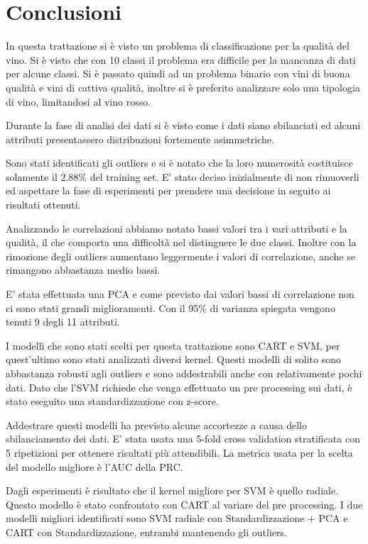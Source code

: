 \chapter{Conclusioni}
\label{ch:conclusioni}
In questa trattazione si è visto un problema di classificazione per la qualità del vino. Si è visto che con 10 classi il problema era difficile per la mancanza di dati per alcune classi. Si è passato quindi ad un problema binario con vini di buona qualità e vini di cattiva qualità, inoltre si è preferito analizzare solo una tipologia di vino, limitandosi al vino rosso.

\noindent
Durante la fase di analisi dei dati si è visto come i dati siano sbilanciati ed alcuni attributi presentassero distribuzioni fortemente asimmetriche.

\noindent
Sono stati identificati gli outliers e si è notato che la loro numerosità costituisce solamente il 2.88\% del training set. E' stato deciso inizialmente di non rimuoverli ed aspettare la fase di esperimenti per prendere una decisione in seguito ai risultati ottenuti.

\noindent
Analizzando le correlazioni abbiamo notato bassi valori tra i vari attributi e la qualità, il che comporta una difficoltà nel distinguere le due classi.
Inoltre con la rimozione degli outliers aumentano leggermente i valori di correlazione, anche se rimangono abbastanza medio bassi.


\noindent
E' stata effettuata una PCA e come previsto dai valori bassi di correlazione non ci sono stati grandi miglioramenti. Con il 95\% di varianza spiegata vengono tenuti 9 degli 11 attributi.

\newpage

\noindent
I modelli che sono stati scelti per questa trattazione sono CART e SVM, per quest'ultimo sono stati analizzati diversi kernel. Questi modelli di solito sono abbastanza robusti agli outliers e sono addestrabili anche con relativamente pochi dati.
Dato che l'SVM richiede che venga effettuato un pre processing sui dati, è stato eseguito una standardizzazione con z-score.

\noindent
Addestrare questi modelli ha previsto alcune accortezze a causa dello sbilanciamento dei dati. E' stata usata una 5-fold cross validation stratificata con 5 ripetizioni per ottenere risultati più attendibili. La metrica usata per la scelta del modello migliore è l'AUC della PRC.

\noindent
Dagli esperimenti è risultato che il kernel migliore per SVM è quello radiale. Questo modello è stato confrontato con CART al variare del pre processing.
I due modelli migliori identificati sono SVM radiale con Standardizzazione + PCA e CART con Standardizzazione, entrambi mantenendo gli outliers.

